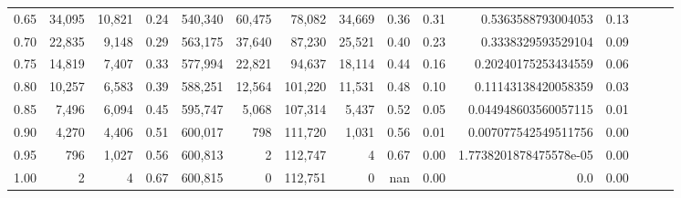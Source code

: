 \begin{tabular}{rrrrrrrrrrrrrrr}
0.65 &  34,095 &  10,821 &  0.24 &  540,340 &   60,475 &   78,082 &   34,669 &  0.36 &  0.31 &      0.5363588793004053 &      0.13 \\
0.70 &  22,835 &   9,148 &  0.29 &  563,175 &   37,640 &   87,230 &   25,521 &  0.40 &  0.23 &      0.3338329593529104 &      0.09 \\
0.75 &  14,819 &   7,407 &  0.33 &  577,994 &   22,821 &   94,637 &   18,114 &  0.44 &  0.16 &     0.20240175253434559 &      0.06 \\
0.80 &  10,257 &   6,583 &  0.39 &  588,251 &   12,564 &  101,220 &   11,531 &  0.48 &  0.10 &     0.11143138420058359 &      0.03 \\
0.85 &   7,496 &   6,094 &  0.45 &  595,747 &    5,068 &  107,314 &    5,437 &  0.52 &  0.05 &    0.044948603560057115 &      0.01 \\
0.90 &   4,270 &   4,406 &  0.51 &  600,017 &      798 &  111,720 &    1,031 &  0.56 &  0.01 &    0.007077542549511756 &      0.00 \\
0.95 &     796 &   1,027 &  0.56 &  600,813 &        2 &  112,747 &        4 &  0.67 &  0.00 &  1.7738201878475578e-05 &      0.00 \\
1.00 &       2 &       4 &  0.67 &  600,815 &        0 &  112,751 &        0 &   nan &  0.00 &                     0.0 &      0.00 \\
\bottomrule
\end{tabular}
